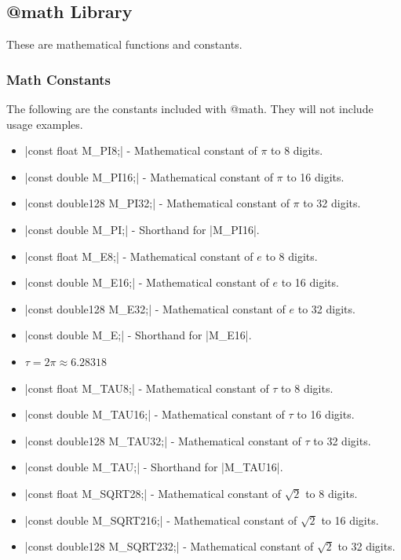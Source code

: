 \documentclass[12pt, letterpaper, oneside]{article}
\begin{document}
	\subsection{@math Library}
	These are mathematical functions and constants.
	\subsubsection{Math Constants}
	The following are the constants included with @math. They will not include usage examples.
	\begin{itemize}
		\item[--] \spverb|const float M_PI8;| - Mathematical constant of $\pi$ to 8 digits.
		\item[--] \spverb|const double M_PI16;| - Mathematical constant of $\pi$ to 16 digits.
		\item[--] \spverb|const double128 M_PI32;| - Mathematical constant of $\pi$ to 32 digits.
		\item[--] \spverb|const double M_PI;| - Shorthand for \spverb|M_PI16|.
		\newline
		\item[--] \spverb|const float M_E8;| - Mathematical constant of $e$ to 8 digits.
		\item[--] \spverb|const double M_E16;| - Mathematical constant of $e$ to 16 digits.
		\item[--] \spverb|const double128 M_E32;| - Mathematical constant of $e$ to 32 digits.
		\item[--] \spverb|const double M_E;| - Shorthand for \spverb|M_E16|.
		\newline
		\item[--] $\tau = 2\pi \approx 6.28318$
		\item[--] \spverb|const float M_TAU8;| - Mathematical constant of $\tau$ to 8 digits.
		\item[--] \spverb|const double M_TAU16;| - Mathematical constant of $\tau$ to 16 digits.
		\item[--] \spverb|const double128 M_TAU32;| - Mathematical constant of $\tau$ to 32 digits.
		\item[--] \spverb|const double M_TAU;| - Shorthand for \spverb|M_TAU16|.
		\newline
		\item[--] \spverb|const float M_SQRT28;| - Mathematical constant of $\sqrt{2}$ to 8 digits.
		\item[--] \spverb|const double M_SQRT216;| - Mathematical constant of $\sqrt{2}$ to 16 digits.
		\item[--] \spverb|const double128 M_SQRT232;| - Mathematical constant of $\sqrt{2}$ to 32 digits.

\end{itemize}
\end{document}
